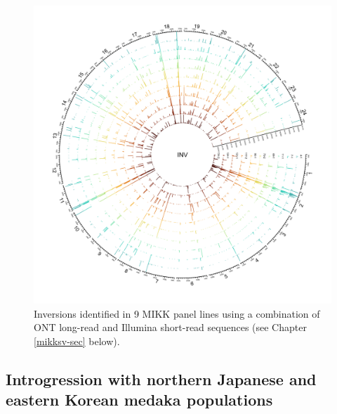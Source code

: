 \documentclass[
]{book}
\begin{document}
\begin{figure}
\includegraphics[width=1\linewidth]{figs/mikk_genome/20210224_sv_invs_lines} \caption{Inversions identified in 9 MIKK panel lines using a combination of ONT long-read and Illumina short-read sequences (see Chapter \ref{mikksv-sec} below).}\label{fig:SVInvs}
\end{figure}

\hypertarget{introgression-sec}{%
\subsection{Introgression with northern Japanese and eastern Korean medaka populations}\label{introgression-sec}}
\end{document}
